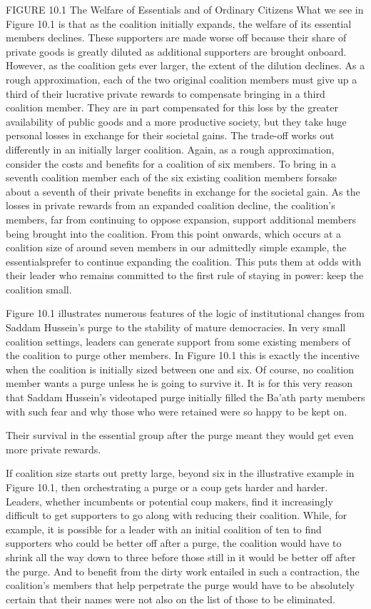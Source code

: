 \documentclass[10pt]{article}
\begin{document}
{\large FIGURE 10.1 The Welfare of Essentials and of Ordinary Citizens What we
see in Figure 10.1 is that as the coalition initially expands, the welfare of its
essential members declines. These supporters are made worse off because their
share of private goods is greatly diluted as additional supporters are brought
onboard. However, as the coalition gets ever larger, the extent of the dilution
declines. As a rough approximation, each of the two original coalition members
must give up a third of their lucrative private rewards to compensate bringing in
a third coalition member. They are in part compensated for this loss by the
greater availability of public goods and a more productive society, but they take
huge personal losses in exchange for their societal gains. The trade-off works
out differently in an initially larger coalition. Again, as a rough
approximation, consider the costs and benefits for a coalition of six members. To
bring in a seventh coalition member each of the six existing coalition members
forsake about a seventh of their private benefits in exchange for the societal
gain. As the losses in private rewards from an expanded coalition decline, the
coalition's members, far from continuing to oppose expansion, support additional
members being brought into the coalition. From this point onwards, which occurs
at a coalition size of around seven members in our admittedly simple example, the
essentialsprefer to continue expanding the coalition. This puts them at odds with
their leader who remains committed to the first rule of staying in power: keep
the coalition small.}

{\large Figure 10.1 illustrates numerous features of the logic of institutional
changes from Saddam Hussein's purge to the stability of mature democracies. In
very small coalition settings, leaders can generate support from some existing
members of the coalition to purge other members. In Figure 10.1 this is exactly
the incentive when the coalition is initially sized between one and six. Of
course, no coalition member wants a purge unless he is going to survive it. It is
for this very reason that Saddam Hussein's videotaped purge initially filled the
Ba'ath party members with such fear and why those who were retained were so happy
to be kept on.}

{\large Their survival in the essential group after the purge meant they would
get even more private rewards.}

{\large If coalition size starts out pretty large, beyond six in the
illustrative example in Figure 10.1, then orchestrating a purge or a coup gets
harder and harder. Leaders, whether incumbents or potential coup makers, find it
increasingly difficult to get supporters to go along with reducing their
coalition. While, for example, it is possible for a leader with an initial
coalition of ten to find supporters who could be better off after a purge, the
coalition would have to shrink all the way down to three before those still in it
would be better off after the purge. And to benefit from the dirty work entailed
in such a contraction, the coalition's members that help perpetrate the purge
would have to be absolutely certain that their names were not also on the list of
those to be eliminated.}
\end{document}
